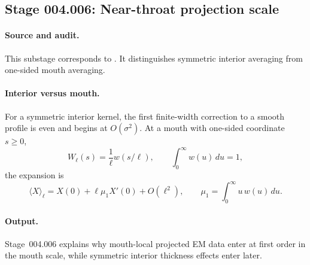 \subsection*{Stage 004.006: Near-throat projection scale}
\label{subsec:stage004006-projected-maxwell-near-throat}

\paragraph{Source and audit.}
This substage corresponds to
.
It distinguishes symmetric interior averaging from one-sided mouth averaging.

\paragraph{Interior versus mouth.}
For a symmetric interior kernel, the first finite-width correction to a smooth
profile is even and begins at \(O(\sigma^2)\).  At a mouth with one-sided
coordinate \(s\ge0\),
\begin{equation}
\label{eq:stage004006-mouth-kernel}
W_\ell(s)=\frac1\ell w(s/\ell),
\qquad
\int_0^\infty w(u)\,du=1,
\end{equation}
the expansion is
\begin{equation}
\label{eq:stage004006-mouth-expansion}
\langle X\rangle_\ell
=X(0)+\ell\mu_1X'(0)+O(\ell^2),
\qquad
\mu_1=\int_0^\infty u\,w(u)\,du .
\end{equation}

\paragraph{Output.}
Stage~004.006 explains why mouth-local projected EM data enter at first order
in the mouth scale, while symmetric interior thickness effects enter later.
